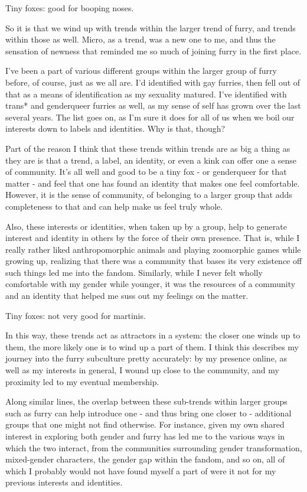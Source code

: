 Tiny foxes: good for booping noses.

So it is that we wind up with trends within the larger trend of furry, and trends within those as well. Micro, as a trend, was a new one to me, and thus the sensation of newness that reminded me so much of joining furry in the first place.

I've been a part of various different groups within the larger group of furry before, of course, just as we all are. I'd identified with gay furries, then fell out of that as a means of identification as my sexuality matured. I've identified with trans* and genderqueer furries as well, as my sense of self has grown over the last several years. The list goes on, as I'm sure it does for all of us when we boil our interests down to labels and identities. Why is that, though?

Part of the reason I think that these trends within trends are as big a thing as they are is that a trend, a label, an identity, or even a kink can offer one a sense of community. It's all well and good to be a tiny fox - or genderqueer for that matter - and feel that one has found an identity that makes one feel comfortable. However, it is the sense of community, of belonging to a larger group that adds completeness to that and can help make us feel truly whole.

Also, these interests or identities, when taken up by a group, help to generate interest and identity in others by the force of their own presence. That is, while I really rather liked anthropomorphic animals and playing zoomorphic games while growing up, realizing that there was a community that bases its very existence off such things led me into the fandom. Similarly, while I never felt wholly comfortable with my gender while younger, it was the resources of a community and an identity that helped me suss out my feelings on the matter.

Tiny foxes: not very good for martinis.

In this way, these trends act as attractors in a system: the closer one winds up to them, the more likely one is to wind up a part of them. I think this describes my journey into the furry subculture pretty accurately: by my presence online, as well as my interests in general, I wound up close to the community, and my proximity led to my eventual membership.

Along similar lines, the overlap between these sub-trends within larger groups such as furry can help introduce one - and thus bring one closer to - additional groups that one might not find otherwise. For instance, given my own shared interest in exploring both gender and furry has led me to the various ways in which the two interact, from the communities surrounding gender transformation, mixed-gender characters, the gender gap within the fandom, and so on, all of which I probably would not have found myself a part of were it not for my previous interests and identities.

